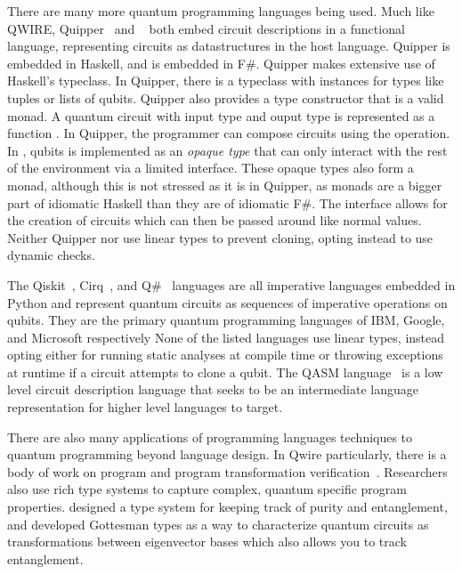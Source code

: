There are many more quantum programming languages being used. 
Much like QWIRE, Quipper~\cite{quipper} and \liquid~\cite{liquid} both embed circuit descriptions in a functional language, representing circuits as datastructures in the host language.
Quipper is embedded in Haskell, and \liquid is embedded in F\#.
Quipper makes extensive use of Haskell's typeclass.
In Quipper, there is a typeclass  with instances for types like tuples or lists of qubits.
Quipper also provides a  type constructor that is a valid monad.
A quantum circuit with input type  and ouput type  is represented as a function .
In Quipper, the programmer can compose circuits using the  operation.
In \liquid, qubits is implemented as an \emph{opaque type} that can only interact with the rest of the environment via a limited interface.
These opaque types also form a monad, although this is not stressed as it is in Quipper, as monads are a bigger part of idiomatic Haskell than they are of idiomatic F\#.
The interface allows for the creation of circuits which can then be passed around like normal values.
Neither Quipper nor \liquid use linear types to prevent cloning, opting instead to use dynamic checks.

The Qiskit~\cite{qiskit}, Cirq~\cite{cirq}, and Q\#~\cite{qsharp} languages are all imperative languages embedded in Python and represent quantum circuits as sequences of imperative operations on qubits.
They are the primary quantum programming languages of IBM, Google, and Microsoft respectively
None of the listed languages use linear types, instead opting either for running static analyses at compile time or throwing exceptions at runtime if a circuit attempts to clone a qubit.
The QASM language~\cite{qasm} is a low level circuit description language that seeks to be an intermediate language representation for higher level languages to target.

There are also many applications of programming languages techniques to quantum programming beyond language design.
In Qwire particularly, there is a body of work on program and program transformation verification~\cite{qwirepractice}.
Researchers also use rich type systems to capture complex, quantum specific program properties.
\citet{twist} designed a type system for keeping track of purity and entanglement, and \citet{gottesmanex} developed Gottesman types as a way to characterize quantum circuits as transformations between eigenvector bases which also allows you to track entanglement.


